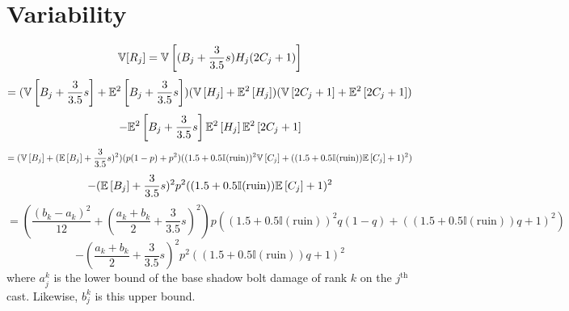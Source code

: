 \section*{Variability}
%
$$
\mathbb{V}[R_j] = \mathbb{V}\left[ (B_j + \frac{3}{3.5} s) H_j (2 C_j + 1) \right]
$$
$$
= (\mathbb{V}\left[ B_j + \frac{3}{3.5} s \right] + \mathbb{E}^2\left[ B_j + \frac{3}{3.5} s \right])
(\mathbb{V}\left[ H_j \right] + \mathbb{E}^2\left[ H_j \right])
(\mathbb{V}\left[ 2 C_j + 1 \right] + \mathbb{E}^2\left[ 2 C_j + 1 \right])
$$
$$
- \mathbb{E}^2\left[ B_j + \frac{3}{3.5} s \right] \mathbb{E}^2\left[ H_j \right] \mathbb{E}^2\left[ 2 C_j + 1 \right]
$$
$$
= (\mathbb{V}\left[ B_j \right] + ( \mathbb{E}\left[ B_j \right] + \frac{3}{3.5} s)^2)
(p (1 - p) + p^2)
( (1.5 + 0.5 \mathbb{I}(\text{ruin}))^2 \mathbb{V}\left[ C_j \right] + ((1.5 + 0.5 \mathbb{I}(\text{ruin})) \mathbb{E}\left[ C_j \right] + 1)^2)
$$
$$
- (\mathbb{E}\left[ B_j \right] + \frac{3}{3.5} s)^2 p^2 ((1.5 + 0.5 \mathbb{I}(\text{ruin})) \mathbb{E}\left[ C_j \right] + 1)^2
$$
$$
= (\frac{(b_k-a_k)^2}{12} + ( \frac{a_k + b_k}{2} + \frac{3}{3.5} s)^2)
p
( (1.5 + 0.5 \mathbb{I}(\text{ruin}))^2 q (1 - q) + ((1.5 + 0.5 \mathbb{I}(\text{ruin})) q + 1)^2)
$$
$$
- (\frac{a_k + b_k}{2} + \frac{3}{3.5} s)^2 p^2 ((1.5 + 0.5 \mathbb{I}(\text{ruin})) q + 1)^2
$$
%
where $a_j^k$ is the lower bound of the base shadow bolt damage of rank $k$ on the $j^\text{th}$ cast. Likewise, $b_j^k$ is this upper bound.


